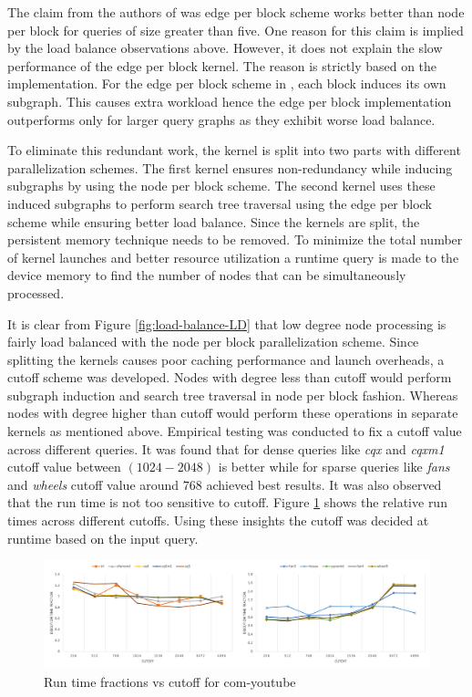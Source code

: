 The claim from the authors of \cite{PARSEC_VD} was edge per block scheme works better than node per block for queries of size greater than five.
One reason for this claim is implied by the load balance observations above. However, it does not explain the slow performance of the edge per block kernel.
The reason is strictly based on the implementation. For the edge per block scheme in \cite{PARSEC_VD}, each block induces its own subgraph.
This causes extra workload hence the edge per block implementation outperforms only for larger query graphs as they exhibit worse load balance.

To eliminate this redundant work, the kernel is split into two parts with different parallelization schemes.
The first kernel ensures non-redundancy while inducing subgraphs by using the node per block scheme.
The second kernel uses these induced subgraphs to perform search tree traversal using the edge per block scheme while ensuring better load balance.
Since the kernels are split, the persistent memory technique needs to be removed.
To minimize the total number of kernel launches and better resource utilization a runtime query is made to the device memory to find the number of nodes that can be simultaneously processed.

It is clear from Figure \ref{fig:load-balance-LD} that low degree node processing is fairly load balanced with the node per block parallelization scheme.
Since splitting the kernels causes poor caching performance and launch overheads, a cutoff scheme was developed.
Nodes with degree less than cutoff would perform subgraph induction and search tree traversal in node per block fashion.
Whereas nodes with degree higher than cutoff would perform these operations in separate kernels as mentioned above.
Empirical testing was conducted to fix a cutoff value across different queries.
It was found that for dense queries like \textit{cqx} and \textit{cqxm1} cutoff value between $(1024 - 2048)$ is better while for sparse queries like \textit{fans} and \textit{wheels} cutoff value around $768$ achieved best results.
It was also observed that the run time is not too sensitive to cutoff.
Figure \ref{fig:cutoff-tests} shows the relative run times across different cutoffs.
Using these insights the cutoff was decided at runtime based on the input query.

\begin{figure}[h]
    \includegraphics[width=\textwidth]{fig/improvements/cutoff-tests-yt.png}
    \caption{Run time fractions vs cutoff for com-youtube}
    \label{fig:cutoff-tests}
\end{figure}

